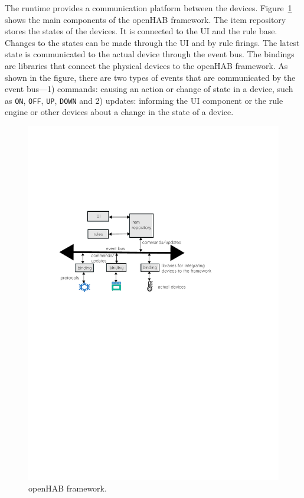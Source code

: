 \documentclass{sig-alternate-05-2015}
\begin{document}
The runtime provides a communication platform between the devices. 
Figure~\ref{fig:framework} shows the main components of the openHAB framework. The item repository stores the states of the devices. It is connected to the UI and the rule base. Changes to the states can be made through the UI and by rule firings. The latest state is communicated to the actual device through the event bus. The bindings are libraries that connect the physical devices to the openHAB framework. As shown in the figure, there are two types of events that are communicated by the event bus---1) commands: causing an action or change of state in a device, such as \texttt{ON}, \texttt{OFF}, \texttt{UP}, \texttt{DOWN} and 2) updates: informing the UI component or the rule engine or other devices about a change in the state of a device.
\begin{figure}
\centering
\includegraphics [trim=-2cm 15cm 0 6.5cm, scale=0.4]{images/framework.pdf}
\caption{openHAB framework.}
\label{fig:framework}
\end{figure} 
\end{document}
